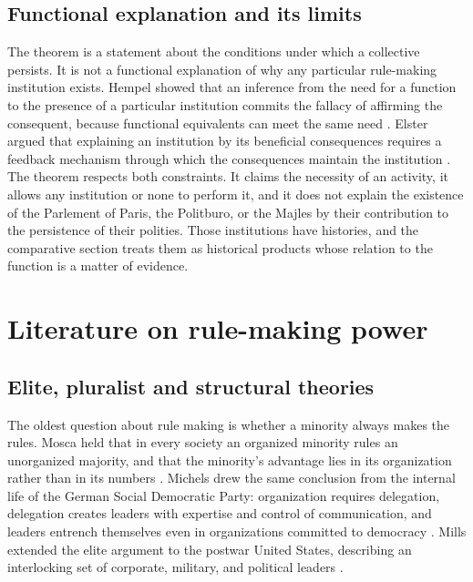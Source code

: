 \documentclass[11pt,letterpaper]{article}
\theoremstyle{definition}
\theoremstyle{remark}
\begin{document}
\subsection{Functional explanation and its limits}

The theorem is a statement about the conditions under which a collective persists. It is not a functional explanation of why any particular rule-making institution exists. Hempel showed that an inference from the need for a function to the presence of a particular institution commits the fallacy of affirming the consequent, because functional equivalents can meet the same need \citep{hempel1959}. Elster argued that explaining an institution by its beneficial consequences requires a feedback mechanism through which the consequences maintain the institution \citep{elster1983}. The theorem respects both constraints. It claims the necessity of an activity, it allows any institution or none to perform it, and it does not explain the existence of the Parlement of Paris, the Politburo, or the Majles by their contribution to the persistence of their polities. Those institutions have histories, and the comparative section treats them as historical products whose relation to the function is a matter of evidence.

\section{Literature on rule-making power}
\label{sec:literature}

\subsection{Elite, pluralist and structural theories}

The oldest question about rule making is whether a minority always makes the rules. Mosca held that in every society an organized minority rules an unorganized majority, and that the minority's advantage lies in its organization rather than in its numbers \citep{mosca1939}. Michels drew the same conclusion from the internal life of the German Social Democratic Party: organization requires delegation, delegation creates leaders with expertise and control of communication, and leaders entrench themselves even in organizations committed to democracy \citep{michels1915}. Mills extended the elite argument to the postwar United States, describing an interlocking set of corporate, military, and political leaders \citep{mills1956}.
\end{document}
